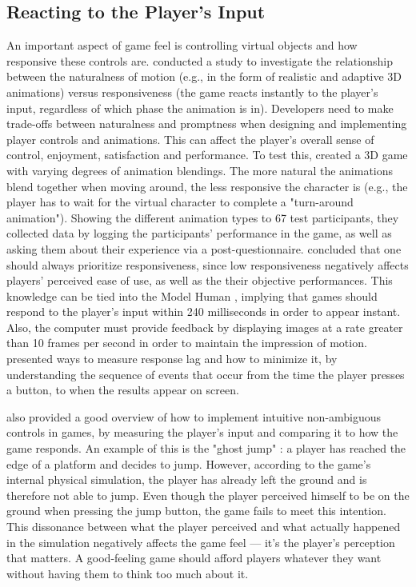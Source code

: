 \subsection{Reacting to the Player's Input}
An important aspect of game feel is controlling virtual objects and how responsive these controls are. \cite{normoyle_trade-offs_2014} conducted a study to investigate the relationship between the naturalness of motion (e.g., in the form of realistic and adaptive 3D animations) versus responsiveness (the game reacts instantly to the player's input, regardless of which phase the animation is in). Developers need to make trade-offs between naturalness and promptness when designing and implementing player controls and animations. This can affect the player's overall sense of control, enjoyment, satisfaction and performance. To test this, \cite{normoyle_trade-offs_2014} created a 3D game with varying degrees of animation blendings. The more natural the animations blend together when moving around, the less responsive the character is (e.g., the player has to wait for the virtual character to complete a "turn-around animation"). Showing the different animation types to 67 test participants, they collected data by logging the participants' performance in the game, as well as asking them about their experience via a post-questionnaire. \cite{normoyle_trade-offs_2014} concluded that one should always prioritize responsiveness, since low responsiveness negatively affects players' perceived ease of use, as well as the their objective performances. This knowledge can be tied into the Model Human \cite{card1986model}, implying that games should respond to the player's input within 240 milliseconds in order to appear instant. Also, the computer must provide feedback by displaying images at a rate greater than 10 frames per second in order to maintain the impression of motion. \cite{measure_lag, program_lag} presented ways to measure response lag and how to minimize it, by understanding the sequence of events that occur from the time the player presses a button, to when the results appear on screen.

\cite{intuitive_buttons} also provided a good overview of how to implement intuitive non-ambiguous controls in games, by measuring the player's input and comparing it to how the game  responds. An example of this is the "ghost jump" \cite{ghostJump, canabalt}: a player has reached the edge of a platform and decides to jump. However, according to the game's internal physical simulation, the player has already left the ground and is therefore not able to jump. Even though the player perceived himself to be on the ground when pressing the jump button, the game fails to meet this intention. This dissonance between what the player perceived and what actually happened in the simulation negatively affects the game feel --- it's the player's perception that matters. A good-feeling game should afford players whatever they want without having them to think too much about it.

